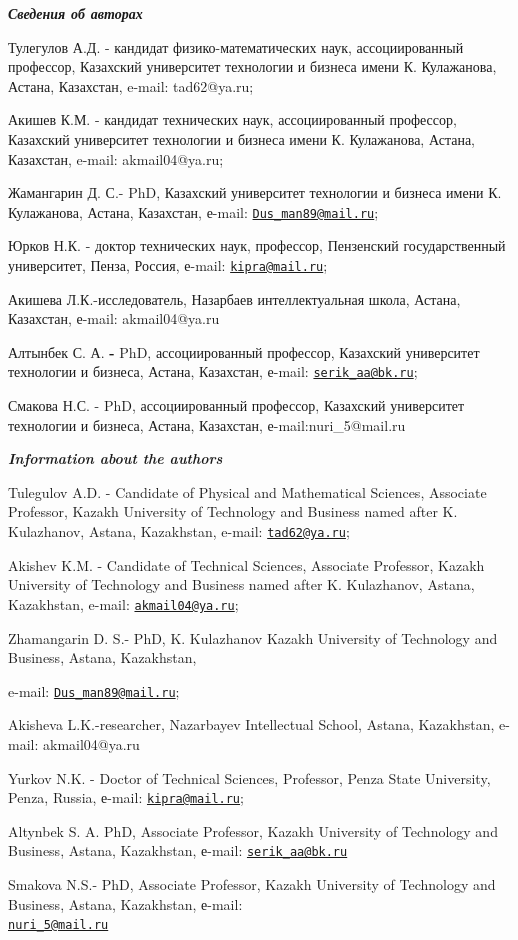 \begin{authorinfo}
\hspace{1em}\emph{{\bfseries Сведения об авторах}}

Тулегулов А.Д. - кандидат физико-математических наук, ассоциированный
профессор, Казахский университет технологии и бизнеса имени К.
Кулажанова, Астана, Казахстан, e-mail: tad62@ya.ru;

Акишев К.М. - кандидат технических наук, ассоциированный профессор,
Казахский университет технологии и бизнеса имени К. Кулажанова, Астана,
Казахстан, e-mail: akmail04@ya.ru;

Жамангарин Д. С.- PhD, Казахский университет технологии и бизнеса имени
К. Кулажанова, Астана, Казахстан, е-mail:
\href{mailto:Dus_man89@mail.ru}{\nolinkurl{Dus\_man89@mail.ru}};

Юрков Н.К. - доктор технических наук, профессор, Пензенский
государственный университет, Пенза, Россия, е-mail:
\href{mailto:kipra@mail.ru}{\nolinkurl{kipra@mail.ru}};

Акишева Л.К.-исследователь, Назарбаев интеллектуальная школа, Астана,
Казахстан, е-mail: akmail04@ya.ru

Алтынбек С. А. {\bfseries -} PhD, ассоциированный профессор, Казахский
университет технологии и бизнеса, Астана, Казахстан, е-mail:
\href{mailto:serik_aa@bk.ru}{\nolinkurl{serik\_aa@bk.ru}};

Смакова Н.С. - PhD, ассоциированный профессор, Казахский университет
технологии и бизнеса, Астана, Казахстан, е-mail:nuri\_5@mail.ru

\hspace{1em}\emph{{\bfseries Information about the authors}}

Tulegulov A.D. - Candidate of Physical and Mathematical Sciences,
Associate Professor, Kazakh University of Technology and Business named
after K. Kulazhanov, Astana, Kazakhstan, e-mail:
\href{mailto:tad62@ya.ru}{\nolinkurl{tad62@ya.ru}};

Akishev K.M. - Candidate of Technical Sciences, Associate Professor,
Kazakh University of Technology and Business named after K. Kulazhanov,
Astana, Kazakhstan, e-mail:
\href{mailto:akmail04@ya.ru}{\nolinkurl{akmail04@ya.ru}};

Zhamangarin D. S.- PhD, K. Kulazhanov Kazakh University of Technology
and Business, Astana, Kazakhstan,

e-mail: \href{mailto:Dus_man89@mail.ru}{\nolinkurl{Dus\_man89@mail.ru}};

Akisheva L.K.-researcher, Nazarbayev Intellectual School, Astana,
Kazakhstan, e-mail: akmail04@ya.ru

Yurkov N.K. - Doctor of Technical Sciences, Professor, Penza State
University, Penza, Russia, е-mail:
\href{mailto:kipra@mail.ru}{\nolinkurl{kipra@mail.ru}};

Altynbek S. A. PhD, Associate Professor, Kazakh University of Technology
and Business, Astana, Kazakhstan, е-mail:
\href{mailto:serik_aa@bk.ru}{\nolinkurl{serik\_aa@bk.ru}}

Smakova N.S.- PhD, Associate Professor, Kazakh University of Technology
and Business, Astana, Kazakhstan, е-mail: \\\href{mailto:nuri\_5@mail.ru}{\nolinkurl{nuri\_5@mail.ru}}
\end{authorinfo}
